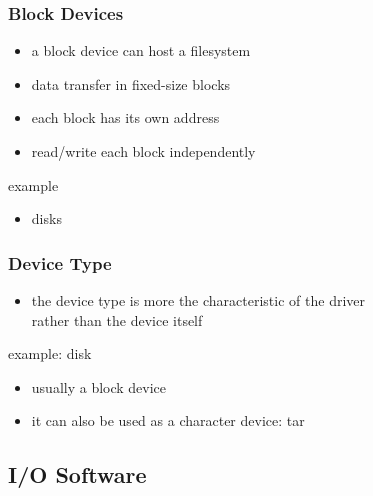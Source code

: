 \documentclass[dvipsnames]{beamer}
\begin{document}
\begin{frame}
  \frametitle{Block Devices}

  \begin{itemize}
    \item a block device can host a filesystem

    \medskip
    \item data transfer in fixed-size blocks
    \item each block has its own address
    \item read/write each block independently
  \end{itemize}

  \begin{exampleblock}{example}
    \begin{itemize}
      \item disks
    \end{itemize}
  \end{exampleblock}
\end{frame}

\begin{frame}
  \frametitle{Device Type}

  \begin{itemize}
    \item the device type is more the characteristic of the driver\\
      rather than the device itself
  \end{itemize}

  \begin{exampleblock}{example: disk}
    \begin{itemize}
      \item usually a block device
      \item it can also be used as a character device: tar
    \end{itemize}
  \end{exampleblock}
\end{frame}

\subsection{I/O Software}
\end{document}

